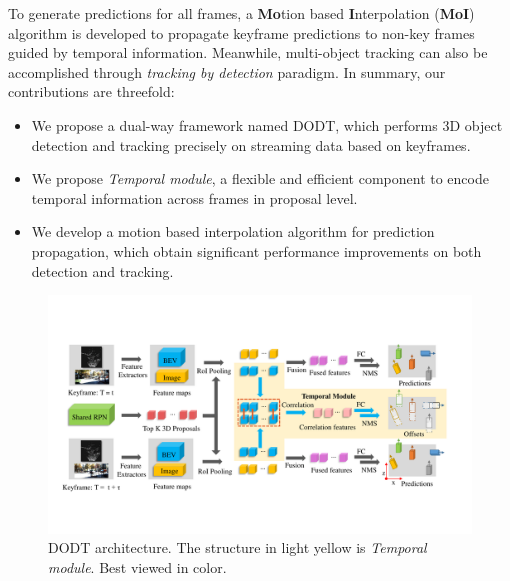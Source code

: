 \documentclass[letterpaper, 10pt, conference]{ieeeconf}  %
\begin{document}
To generate predictions for all frames, a \textbf{Mo}tion based \textbf{I}nterpolation (\textbf{MoI}) algorithm is developed to propagate keyframe predictions to non-key frames guided by temporal information. Meanwhile, multi-object tracking can also be accomplished through \textit{tracking by detection} \cite{lenz2015followme} paradigm. In summary, our contributions are threefold:
\begin{itemize}
	\item We propose a dual-way framework named DODT,  which performs 3D object detection and tracking precisely on streaming data based on keyframes.
	\item We propose \textit{Temporal module}, a flexible and efficient component to encode temporal information across frames in proposal level.
	\item We develop a motion based interpolation algorithm for prediction propagation, which obtain significant performance improvements on both detection and tracking.  
\end{itemize}

\begin{figure}
	\begin{center}
		\includegraphics[trim={1.1cm, 3.3cm, 1.5cm, 3.5cm}, clip, width=\textwidth]{images/structure_final.pdf}
	\end{center}
	\setlength{\abovecaptionskip}{-1pt}
	\caption{DODT architecture. The structure in light yellow is \textit{Temporal module}. Best viewed in color.}
	\label{fig:dodt}
	\vspace{-0.4cm}
\end{figure}
\end{document}
